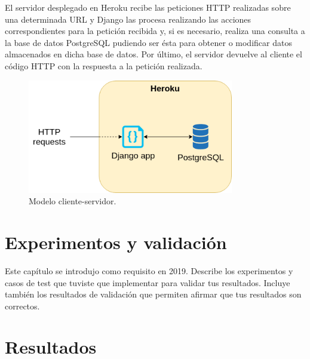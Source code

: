 \documentclass[a4paper, 12pt]{book}
\begin{document}
El servidor desplegado en Heroku recibe las peticiones HTTP realizadas sobre una determinada URL y Django las procesa realizando las acciones correspondientes para la petición recibida y, si es necesario, realiza una consulta a la base de datos PostgreSQL pudiendo ser ésta para obtener o modificar datos almacenados en dicha base de datos.
Por último, el servidor devuelve al cliente el código HTTP con la respuesta a la petición realizada.
\newline
\begin{figure}[h]
  \centering
  \includegraphics[width=9cm, keepaspectratio]{img/servidor.png}
  \caption{Modelo cliente-servidor.}\label{fig:servidor}
\end{figure}



\cleardoublepage
\chapter{Experimentos y validación}

Este capítulo se introdujo como requisito en 2019. 
Describe los experimentos y casos de test que tuviste que implementar para validar tus resultados. 
Incluye también los resultados de validación que permiten afirmar que tus resultados son correctos. 



\cleardoublepage
\chapter{Resultados}
\end{document}
